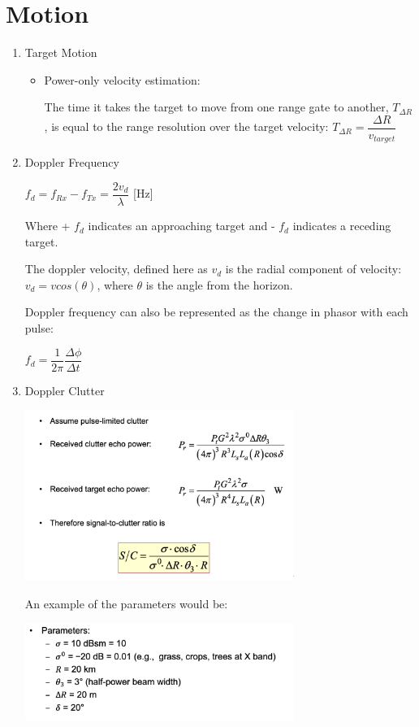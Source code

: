 \documentclass[10pt]{article}
\renewcommand{\frac}{\dfrac}
\begin{document}
\section{Motion}

\begin{enumerate}
	
	\item{Target Motion}
	
	\begin{itemize}
	
		\item Power-only velocity estimation:
	
		The time it takes the target to move from one range gate to another, $T_{\Delta R}$, is equal to the range 	resolution over the target velocity: $T_{\Delta R} = \frac{\Delta R}{v_{target}}$
		

		
		
	\end{itemize}
	
	\item{Doppler Frequency}
	
			$f_d = f_{Rx} - f_{Tx} = \frac{2 v_d}{\lambda}$ [Hz]
		
		Where + $f_d$ indicates an approaching target and - $f_d$ indicates a receding target.
		
		The doppler velocity, defined here as $v_d$ is the radial component of velocity: $v_d = v cos (\theta)$, where $\theta$ is the angle from the horizon. 
		
		Doppler frequency can also be represented as the change in phasor with each pulse:
		
		$f_d = \frac{1}{2\pi}\frac{\Delta \phi}{\Delta t}$
	
	
	\item{Doppler Clutter}
	
	\includegraphics[width=0.69\textwidth]{figs/doppler_clutter.png}
	
	An example of the parameters would be:
	
	\includegraphics[width=0.69\textwidth]{figs/clutter_params.png}





\end{enumerate}
\end{document}
